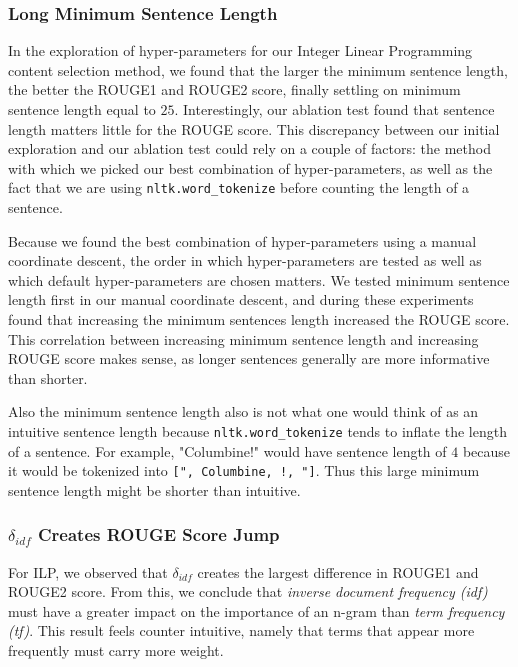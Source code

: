 \subsubsection{Long Minimum Sentence Length}

In the exploration of hyper-parameters for our Integer Linear Programming content selection method, we found that the larger the minimum sentence length, the better the ROUGE1 and ROUGE2 score, finally settling on minimum sentence length equal to $25$. Interestingly, our ablation test found that sentence length matters little for the ROUGE score. This discrepancy between our initial exploration and our ablation test could rely on a couple of factors: the method with which we picked our best combination of hyper-parameters, as well as the fact that we are using \texttt{nltk.word\_tokenize} before counting the length of a sentence. 

Because we found the best combination of hyper-parameters using a manual coordinate descent, the order in which hyper-parameters are tested as well as which default hyper-parameters are chosen matters. We tested minimum sentence length first in our manual coordinate descent, and during these experiments found that increasing the minimum sentences length increased the ROUGE score. This correlation between increasing minimum sentence length and increasing ROUGE score makes sense, as longer sentences generally are more informative than shorter.

Also the minimum sentence length also is not what one would think of as an intuitive sentence length because \texttt{nltk.word\_tokenize} tends to inflate the length of a sentence. For example, "Columbine!" would have sentence length of $4$ because it would be tokenized into \texttt{[", Columbine, !, "]}. Thus this large minimum sentence length might be shorter than intuitive.

\subsubsection{$\delta_{idf}$ Creates ROUGE Score Jump}

For ILP, we observed that $\delta_{idf}$ creates the largest difference in ROUGE1 and ROUGE2 score. From this, we conclude that \textit{inverse document frequency (idf)} must have a greater impact on the importance of an n-gram than \textit{term frequency (tf)}. This result feels counter intuitive, namely that terms that appear more frequently must carry more weight. 

